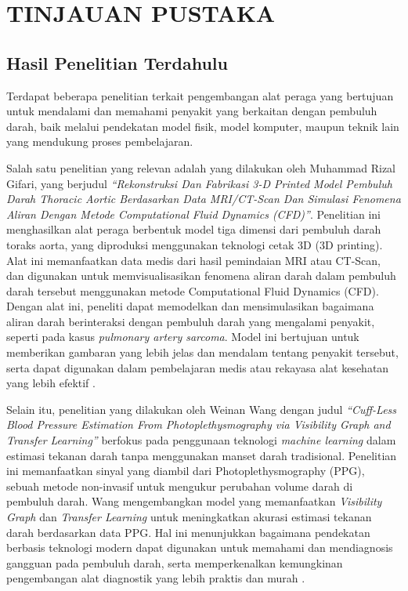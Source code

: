 \chapter{TINJAUAN PUSTAKA}
\label{chap:tinjauanpustaka}



\section{Hasil Penelitian Terdahulu}
\label{sec:penelitianterdahulu}

Terdapat beberapa penelitian terkait pengembangan alat peraga yang bertujuan untuk mendalami dan memahami penyakit yang berkaitan dengan pembuluh darah, baik melalui pendekatan model fisik, model komputer, maupun teknik lain yang mendukung proses pembelajaran.

Salah satu penelitian yang relevan adalah yang dilakukan oleh Muhammad Rizal Gifari, yang berjudul \emph{“Rekonstruksi Dan Fabrikasi 3-D Printed Model Pembuluh Darah Thoracic Aortic Berdasarkan Data MRI/CT-Scan Dan Simulasi Fenomena Aliran Dengan Metode Computational Fluid Dynamics (CFD)”}. Penelitian ini menghasilkan alat peraga berbentuk model tiga dimensi dari pembuluh darah toraks aorta, yang diproduksi menggunakan teknologi cetak 3D (3D printing). Alat ini memanfaatkan data medis dari hasil pemindaian MRI atau CT-Scan, dan digunakan untuk memvisualisasikan fenomena aliran darah dalam pembuluh darah tersebut menggunakan metode Computational Fluid Dynamics (CFD). Dengan alat ini, peneliti dapat memodelkan dan mensimulasikan bagaimana aliran darah berinteraksi dengan pembuluh darah yang mengalami penyakit, seperti pada kasus \emph{pulmonary artery sarcoma}. Model ini bertujuan untuk memberikan gambaran yang lebih jelas dan mendalam tentang penyakit tersebut, serta dapat digunakan dalam pembelajaran medis atau rekayasa alat kesehatan yang lebih efektif \cite{gifari2023rekonstruksi}.

Selain itu, penelitian yang dilakukan oleh Weinan Wang dengan judul \emph{“Cuff-Less Blood Pressure Estimation From Photoplethysmography via Visibility Graph and Transfer Learning”} berfokus pada penggunaan teknologi \emph{machine learning} dalam estimasi tekanan darah tanpa menggunakan manset darah tradisional. Penelitian ini memanfaatkan sinyal yang diambil dari Photoplethysmography (PPG), sebuah metode non-invasif untuk mengukur perubahan volume darah di pembuluh darah. Wang mengembangkan model yang memanfaatkan \emph{Visibility Graph} dan \emph{Transfer Learning} untuk meningkatkan akurasi estimasi tekanan darah berdasarkan data PPG. Hal ini menunjukkan bagaimana pendekatan berbasis teknologi modern dapat digunakan untuk memahami dan mendiagnosis gangguan pada pembuluh darah, serta memperkenalkan kemungkinan pengembangan alat diagnostik yang lebih praktis dan murah \cite{wang2022cuffless}.

